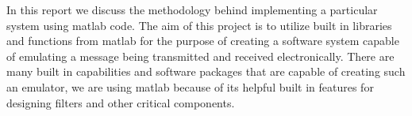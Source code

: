 In this report we discuss the methodology behind implementing a particular system using matlab code. 
The aim of this project is to utilize built in libraries and functions from matlab for the purpose of creating a software system capable of emulating a message being transmitted and received electronically. There are many built in capabilities and software packages that are capable of creating such an emulator, we are using matlab because of its helpful built in features for designing filters and other critical components. 